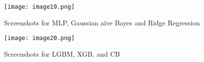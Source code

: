\documentclass{article}
\begin{document}
\renewcommand{\thefigure}{A.\arabic{figure}}  %
\setcounter{figure}{1}  %

\begin{figure}[h!]
   \centering
   \texttt{[image: image19.png]}
   \caption{Screenshots for MLP, Gaussian a\"{i}ve Bayes and Ridge Regression}
   \label{fig:mlp_screenshot}
\end{figure}
\newpage
\begin{figure}[h!]
   \centering
   \texttt{[image: image20.png]}
   \caption{Screenshots for LGBM, XGB, and CB}
   \label{fig:boosting_screenshot}
\end{figure}
\end{document}
